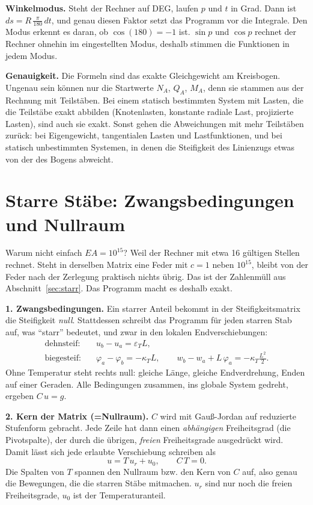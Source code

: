 \textbf{Winkelmodus.} Steht der Rechner auf DEG, laufen $p$ und $t$ in Grad. Dann ist
$ds = R\,\frac{\pi}{180}\,dt$, und genau diesen Faktor setzt das Programm vor die Integrale. Den
Modus erkennt es daran, ob $\cos(180) = -1$ ist. $\sin p$ und $\cos p$ rechnet der Rechner
ohnehin im eingestellten Modus, deshalb stimmen die Funktionen in jedem Modus.

\textbf{Genauigkeit.} Die Formeln sind das exakte Gleichgewicht am Kreisbogen. Ungenau sein können
nur die Startwerte $N_A$, $Q_A$, $M_A$, denn sie stammen aus der Rechnung mit Teilstäben. Bei einem
statisch bestimmten System mit Lasten, die die Teilstäbe exakt abbilden (Knotenlasten, konstante
radiale Last, projizierte Lasten), sind auch sie exakt. Sonst gehen die Abweichungen mit mehr
Teilstäben zurück: bei Eigengewicht, tangentialen Lasten und Lastfunktionen, und bei statisch
unbestimmten Systemen, in denen die Steifigkeit des Linienzugs etwas von der des Bogens abweicht.

\section{Starre Stäbe: Zwangsbedingungen und Nullraum}\label{sec:mathe-starr}

Warum nicht einfach $EA = 10^{15}$? Weil der Rechner mit etwa 16 gültigen Stellen rechnet. Steht
in derselben Matrix eine Feder mit $c = 1$ neben $10^{15}$, bleibt von der Feder nach der
Zerlegung praktisch nichts übrig. Das ist der Zahlenmüll aus Abschnitt~\ref{sec:starr}. Das
Programm macht es deshalb exakt.

\textbf{1. Zwangsbedingungen.} Ein starrer Anteil bekommt in der Steifigkeitsmatrix die Steifigkeit
\emph{null}. Stattdessen schreibt das Programm für jeden starren Stab auf, was \enquote{starr}
bedeutet, und zwar in den lokalen Endverschiebungen:
\begin{align*}
  \text{dehnsteif:}\quad & u_b - u_a = \varepsilon_T L, \\
  \text{biegesteif:}\quad & \varphi_a - \varphi_b = -\kappa_T L, \qquad
                            w_b - w_a + L\,\varphi_a = -\kappa_T \frac{L^2}{2} .
\end{align*}
Ohne Temperatur steht rechts null: gleiche Länge, gleiche Endverdrehung, Enden auf einer Geraden.
Alle Bedingungen zusammen, ins globale System gedreht, ergeben $C\,u = g$.

\textbf{2. Kern der Matrix (=Nullraum).} $C$ wird mit Gauß-Jordan auf reduzierte Stufenform gebracht. Jede Zeile hat
dann einen \emph{abhängigen} Freiheitsgrad (die Pivotspalte), der durch die übrigen, \emph{freien}
Freiheitsgrade ausgedrückt wird. Damit lässt sich jede erlaubte Verschiebung schreiben als
\[
  u = T\,u_r + u_0 , \qquad C\,T = 0 .
\]
Die Spalten von $T$ spannen den Nullraum bzw. den Kern von $C$ auf, also genau die Bewegungen, die die starren
Stäbe mitmachen. $u_r$ sind nur noch die freien Freiheitsgrade, $u_0$ ist der Temperaturanteil.

